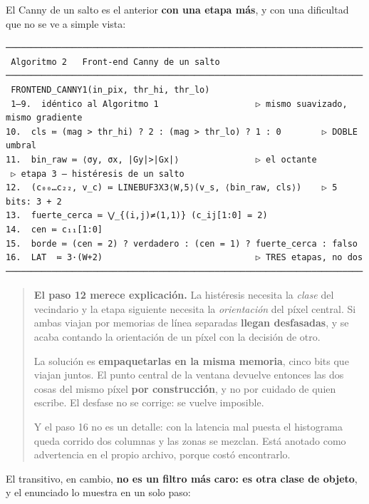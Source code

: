 El Canny de un salto es el anterior \textbf{con una etapa más}, y con
una dificultad que no se ve a simple vista:

\begin{verbatim}
──────────────────────────────────────────────────────────────────────
 Algoritmo 2   Front-end Canny de un salto
──────────────────────────────────────────────────────────────────────
 FRONTEND_CANNY1(in_pix, thr_hi, thr_lo)
 1–9.  idéntico al Algoritmo 1                   ▷ mismo suavizado, mismo gradiente
10.  cls ≔ (mag > thr_hi) ? 2 : (mag > thr_lo) ? 1 : 0        ▷ DOBLE umbral
11.  bin_raw ≔ ⟨σy, σx, |Gy|>|Gx|⟩               ▷ el octante
 ▷ etapa 3 — histéresis de un salto
12.  (c₀₀…c₂₂, v_c) ≔ LINEBUF3X3⟨W,5⟩(v_s, ⟨bin_raw, cls⟩)    ▷ 5 bits: 3 + 2
13.  fuerte_cerca ≔ ⋁_{(i,j)≠(1,1)} (c_ij[1:0] = 2)
14.  cen ≔ c₁₁[1:0]
15.  borde ≔ (cen = 2) ? verdadero : (cen = 1) ? fuerte_cerca : falso
16.  LAT  ≔ 3·(W+2)                              ▷ TRES etapas, no dos
──────────────────────────────────────────────────────────────────────
\end{verbatim}

\begin{quote}
\textbf{El paso 12 merece explicación.} La histéresis necesita la
\emph{clase} del vecindario y la etapa siguiente necesita la
\emph{orientación} del píxel central. Si ambas viajan por memorias de
línea separadas \textbf{llegan desfasadas}, y se acaba contando la
orientación de un píxel con la decisión de otro.

La solución es \textbf{empaquetarlas en la misma memoria}, cinco bits
que viajan juntos. El punto central de la ventana devuelve entonces las
dos cosas del mismo píxel \textbf{por construcción}, y no por cuidado de
quien escribe. El desfase no se corrige: se vuelve imposible.

Y el paso 16 no es un detalle: con la latencia mal puesta el histograma
queda corrido dos columnas y las zonas se mezclan. Está anotado como
advertencia en el propio archivo, porque costó encontrarlo.
\end{quote}

El transitivo, en cambio, \textbf{no es un filtro más caro: es otra
clase de objeto}, y el enunciado lo muestra en un solo paso:

